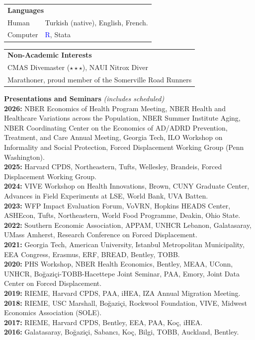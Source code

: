 \documentclass[12pt]{article}
\begin{document}
\begin{tabular}{p{3cm}p{\dimexpr\textwidth-3cm\relax}}
\multicolumn{2}{l}{\textbf{Languages}} \\[3pt] 
Human  & Turkish (native), English, French. \\ 
Computer & \textsf{\textcolor{blue}{R}}, {\sffamily Stata} \\

\end{tabular}

\begin{tabular}{p{\textwidth}}

\multicolumn{1}{l}{\textbf{Non-Academic Interests}} \\[5pt] 
CMAS Divemaster ($\star\star\star$), NAUI Nitrox Diver \\
Marathoner, proud member of the Somerville Road Runners \\

\end{tabular}

\vspace{0.3cm}
\noindent\textbf{Presentations and Seminars} \textit{(includes scheduled)}\\[5pt]
\noindent\textbf{2026:} NBER Economics of Health Program Meeting, NBER Health and Healthcare Variations across the Population, NBER Summer Institute Aging, NBER Coordinating Center on the Economics of AD/ADRD Prevention, Treatment, and Care Annual Meeting, Georgia Tech, ILO Workshop on Informality and Social Protection, Forced Displacement Working Group (Penn Washington).\\[3pt]
\textbf{2025:} Harvard CPDS, Northeastern, Tufts, Wellesley, Brandeis, Forced Displacement Working Group.\\[3pt]
\textbf{2024:} VIVE Workshop on Health Innovations, Brown, CUNY Graduate Center, Advances in Field Experiments at LSE, World Bank, UVA Batten.\\[3pt]
\textbf{2023:} WFP Impact Evaluation Forum, VoVRN, Hopkins HEADS Center, ASHEcon, Tufts, Northeastern, World Food Programme, Deakin, Ohio State.\\[3pt]
\textbf{2022:} Southern Economic Association, APPAM, UNHCR Lebanon, Galatasaray, UMass Amherst, Research Conference on Forced Displacement.\\[3pt]
\textbf{2021:} Georgia Tech, American University, Istanbul Metropolitan Municipality, EEA Congress, Erasmus, ERF, BREAD, Bentley, TOBB.\\[3pt]
\textbf{2020:} PHS Workshop, NBER Health Economics, Bentley, MEAA, UConn, UNHCR, Bo\u{g}azi\c{c}i-TOBB-Hacettepe Joint Seminar, PAA, Emory, Joint Data Center on Forced Displacement.\\[3pt]
\textbf{2019:} RIEME, Harvard CPDS, PAA, iHEA, IZA Annual Migration Meeting.\\[3pt]
\textbf{2018:} RIEME, USC Marshall, Bo\u{g}azi\c{c}i, Rockwool Foundation, VIVE, Midwest Economics Association (SOLE).\\[3pt]
\textbf{2017:} RIEME, Harvard CPDS, Bentley, EEA, PAA, Ko\c{c}, iHEA.\\[3pt]
\textbf{2016:} Galatasaray, Bo\u{g}azi\c{c}i, Sabanc{\i}, Ko\c{c}, Bilgi, TOBB, Auckland, Bentley.
\end{document}

